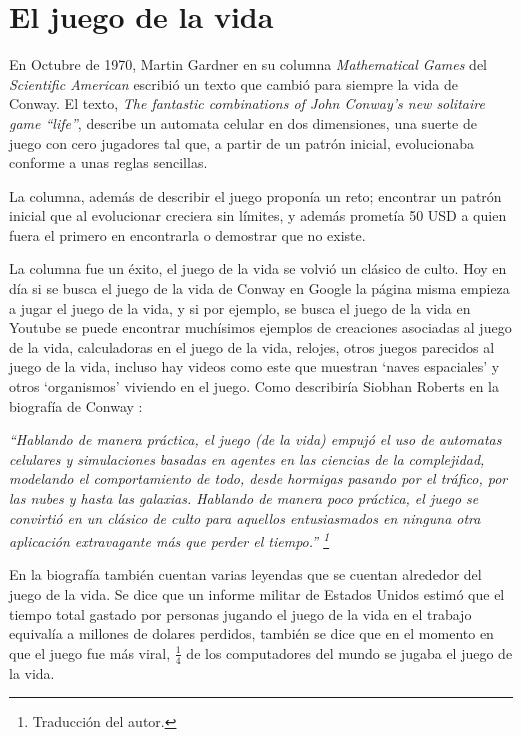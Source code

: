 \section{El juego de la vida}

En Octubre de 1970, Martin Gardner en su columna \textit{Mathematical Games} del \textit{Scientific American} \cite{Gardner1970} escribi\'o un texto que cambi\'o para siempre la vida de Conway. El texto, \textit{The fantastic combinations of John Conway's new solitaire game ``life''}, describe un automata celular en dos dimensiones, una suerte de juego con cero jugadores tal que, a partir de un patr\'on inicial, evolucionaba conforme a unas reglas sencillas.

La columna, adem\'as de describir el juego propon\'ia un reto; encontrar un patr\'on inicial que al evolucionar creciera sin l\'imites, y adem\'as promet\'ia 50 USD a quien fuera el primero en encontrarla o demostrar que no existe.

La columna fue un \'exito, el juego de la vida se volvi\'o un cl\'asico de culto. Hoy en d\'ia si se busca el juego de la vida de Conway en Google la p\'agina misma empieza a jugar el juego de la vida, y si por ejemplo, se busca el juego de la vida en Youtube se puede encontrar much\'isimos ejemplos de creaciones asociadas al juego de la vida, calculadoras en el juego de la vida, relojes, otros juegos parecidos al juego de la vida, incluso hay videos como este \cite{YTEpicLife} que muestran `naves espaciales' y otros `organismos' viviendo en el juego. Como describir\'ia Siobhan Roberts en la biograf\'ia de Conway \cite{Roberts2015-ur}:

\textit{``Hablando de manera pr\'actica, el juego (de la vida) empuj\'o el uso de automatas celulares y simulaciones basadas en agentes en las ciencias de la complejidad, modelando el comportamiento de todo, desde hormigas pasando por el tr\'afico, por las nubes y hasta las galaxias. Hablando de manera poco pr\'actica, el juego se convirti\'o en un cl\'asico de culto para aquellos entusiasmados en ninguna otra aplicaci\'on extravagante m\'as que perder el tiempo.'' \footnote{Traducci\'on del autor.}}

En la biograf\'ia tambi\'en cuentan varias leyendas que se cuentan alrededor del juego de la vida. Se dice que un informe militar de Estados Unidos estim\'o que el tiempo total gastado por personas jugando el juego de la vida en el trabajo equival\'ia a millones de dolares perdidos, tambi\'en se dice que en el momento en que el juego fue m\'as viral, $\frac{1}{4}$ de los computadores del mundo se jugaba el juego de la vida.

